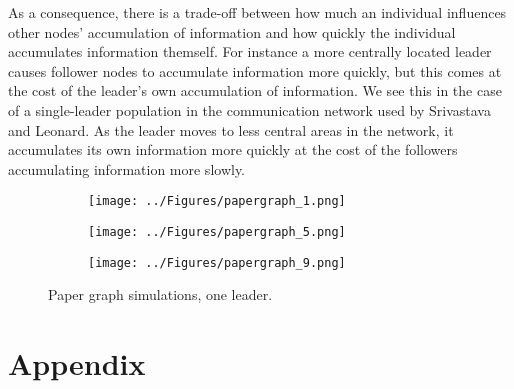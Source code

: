 \documentclass[pageno]{jpaper}
\begin{document}
As a consequence, there is a trade-off between how much an individual influences other nodes' accumulation of information and how quickly the individual accumulates information themself. For instance a more centrally located leader causes follower nodes to accumulate information more quickly, but this comes at the cost of the leader's own accumulation of information. We see this in the case of a single-leader population in the communication network used by Srivastava and Leonard. As the leader moves to less central areas in the network, it accumulates its own information  more quickly at the cost of the followers accumulating information more slowly.
\begin{figure}[!htb]
\centering
\begin{subfigure}[b]{0.4\textwidth}
      \texttt{[image: ../Figures/papergraph\_1.png]}
\end{subfigure}
\begin{subfigure}[b]{0.4\textwidth}
      \texttt{[image: ../Figures/papergraph\_5.png]}
\end{subfigure}
\begin{subfigure}[b]{0.4\textwidth}
      \texttt{[image: ../Figures/papergraph\_9.png]}
\end{subfigure}
\caption{Paper graph simulations, one leader.}\label{fig:sim_paper_oneleader}
\end{figure}



\section{Appendix}\label{appendix}
\end{document}

